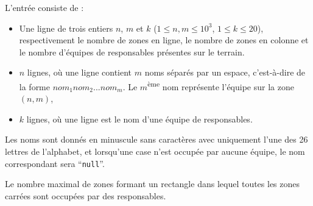 \begin{Input}
	L'entrée consiste de :
	\begin{itemize}
		\item Une ligne de trois entiers $n$, $m$ et $k$ ($1 \le n,m \le 10^3$, $1 \le k \le 20$),
respectivement le nombre de zones en ligne, le nombre de zones en colonne et le nombre d'équipes de responsables présentes sur le terrain.
		\item $n$ lignes, où une ligne contient $m$ noms séparés par un espace, c'est-à-dire de la forme $nom_1 nom_2 ... nom_m$. Le $m$\textsuperscript{ème} nom représente l'équipe sur la zone $(n,m)$,
		\item $k$ lignes, où une ligne est le nom d'une équipe de responsables.
	\end{itemize}
	Les noms sont donnés en minuscule sans caractères avec uniquement l'une des 26 lettres de l'alphabet, et lorsqu'une case n'est occupée par aucune équipe, le nom correspondant sera ``\verb|null|''.
\end{Input}

\begin{Output}
	Le nombre maximal de zones formant un rectangle dans lequel toutes les zones carrées sont occupées par des responsables.
\end{Output}
